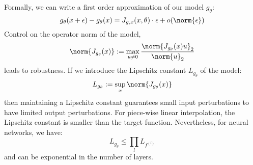 Formally, we can write a first order approximation of our model $g_\theta$:
\begin{equation*}
    g_\theta(x+\epsilon)-g_\theta(x) = J_{g,x}(x,\theta)\cdot\epsilon+o(\norm{\epsilon})
\end{equation*}
Control on the operator norm of the model,
\begin{equation*}
    \norm{J_{g_\theta}(x)} := \max_{u\neq0}\frac{\norm{J_{g_\theta}(x)u}_2}{\norm{u}_2}
\end{equation*}
leads to robustness. If we introduce the Lipschitz constant $L_{g_\theta}$ of the model:
\begin{equation*}
    L_{g_\theta} := \sup_x \norm{J_{g_\theta}(x)}
\end{equation*}
then maintaining a  Lipschitz constant guarantees small input perturbations to have limited output perturbations. For piece-wise linear interpolation, the Lipschitz constant is smaller than the target function. Nevertheless, for neural networks, we have:
\begin{equation*}
    L_{g_\theta} \leq\prod_lL_{f^{(l)}}
\end{equation*}
and can be exponential in the number of layers.

\newpage